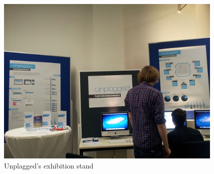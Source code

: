 \begin{appendix}
\begin{figure}[!h]
  \centering
    \includegraphics[width=0.97\textwidth]{images/unplagged_exhibition_stand4.jpg}
  \caption{Unplagged's exhibition stand}
  \label{fig:unplagged_exhibition_stand4}
\end{figure}

\end{appendix}
